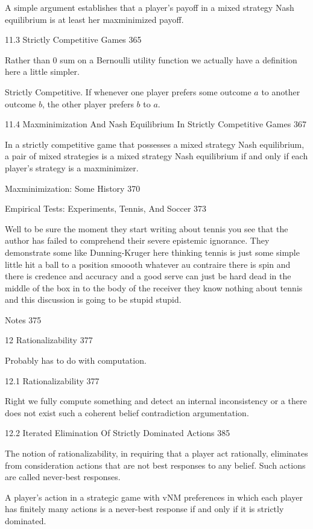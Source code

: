 A simple argument establishes that a player's payoff in a mixed strategy Nash equilibrium is at least her maxminimized payoff.

11.3 Strictly Competitive Games 365

Rather than $0$ sum on a Bernoulli utility function we actually have a definition here a little simpler.

Strictly Competitive. If whenever one player prefers some outcome $a$ to another outcome $b$, the other player prefers $b$ to $a$.

11.4 Maxminimization And Nash Equilibrium In Strictly Competitive Games 367

In a strictly competitive game that possesses a mixed strategy Nash equilibrium, a pair of mixed strategies is a mixed strategy Nash equilibrium if and only if each player's strategy is a maxminimizer.

Maxminimization: Some History 370



Empirical Tests: Experiments, Tennis, And Soccer 373

Well to be sure the moment they start writing about tennis you see that the author has failed to comprehend their severe epistemic ignorance. They demonstrate some like Dunning-Kruger here thinking tennis is just some simple little hit a ball to a position smoooth whatever au contraire there is spin and there is credence and accuracy and a good serve can just be hard dead in the middle of the box in to the body of the receiver they know nothing about tennis and this discussion is going to be stupid stupid.

Notes 375



12 Rationalizability 377

Probably has to do with computation.

12.1 Rationalizability 377

Right we fully compute something and detect an internal inconsistency or a there does not exist such a coherent belief contradiction argumentation.

12.2 Iterated Elimination Of Strictly Dominated Actions 385

The notion of rationalizability, in requiring that a player act rationally, eliminates from consideration actions that are not best responses to any belief. Such actions are called never-best responses.

A player's action in a strategic game with vNM preferences in which each player has finitely many actions is a never-best response if and only if it is strictly dominated.

